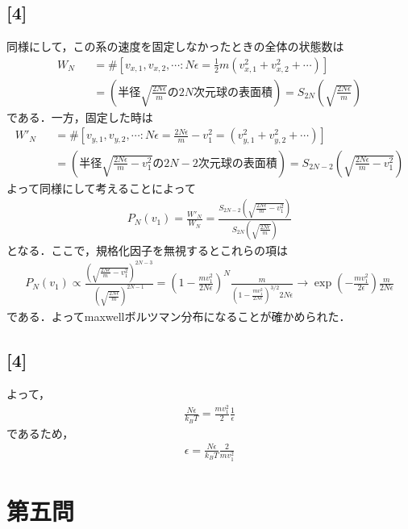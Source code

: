 \documentclass[12pt,dvipdfmx]{jsarticle}
\begin{document}
\subsection*{\large{[4]}}
同様にして，この系の速度を固定しなかったときの全体の状態数は
\begin{eqnarray}
  W_{N} &&= \# \left[ v_{x,1},v_{x,2},\cdots: N\epsilon = \frac{1}{2}m \left( v_{x,1}^2 +v_{x,2}^2 + \cdots  \right) \right] \\
  &&= \left( 半径 \sqrt{\frac{2N\epsilon}{m}}の2N次元球の表面積 \right) = S_{2N}\left( \sqrt{\frac{2N\epsilon}{m}} \right)
\end{eqnarray}
である．一方，固定した時は
\begin{eqnarray}
  W'_{N} &&= \# \left[ v_{y,1},v_{y,2},\cdots: N\epsilon = \frac{2N\epsilon}{m}-v_1^2= \left( v_{y,1}^2 +v_{y,2}^2 + \cdots  \right) \right] \\
  &&= \left( 半径 \sqrt{\frac{2N\epsilon}{m}-v_1^2}の2N-2次元球の表面積 \right) = S_{2N-2}\left( \sqrt{\frac{2N\epsilon}{m}-v_1^2} \right)
\end{eqnarray}
よって同様にして考えることによって
\begin{eqnarray}
  P_N(v_1) = \frac{W'_{N}}{W_{N}}= \frac{S_{2N-2}\left( \sqrt{\frac{2N\epsilon}{m}-v_1^2} \right)}{S_{2N}\left( \sqrt{\frac{2N\epsilon}{m}} \right)}
\end{eqnarray}
となる．ここで，規格化因子を無視するとこれらの項は
\begin{eqnarray}
  P_N(v_1) \propto \frac{\left( \sqrt{\frac{2N\epsilon}{m}-v_1^2} \right)^{2N-3}}{\left( \sqrt{\frac{2N\epsilon}{m}} \right)^{2N-1}} = \left( 1- \frac{mv_1^2}{2N\epsilon} \right)^N \frac{m}{\left( 1-\frac{mv_1^2}{2N\epsilon} \right)^{3/2}2N\epsilon}\to \exp\left( -\frac{mv_1^2}{2\epsilon} \right)\frac{m}{2N\epsilon}
\end{eqnarray} 
である．よってmaxwellボルツマン分布になることが確かめられた．
\subsection*{\large{[4]}}
よって，
\begin{eqnarray}
  \frac{N\epsilon}{k_B T} = \frac{mv_1^2}{2}\frac{1}{\epsilon}
\end{eqnarray}
であるため，
\begin{eqnarray}
  \epsilon = \frac{N\epsilon}{k_B T} \frac{2}{mv_1^2}
\end{eqnarray}
\newpage
\section*{\Large{第五問}}
\end{document}
